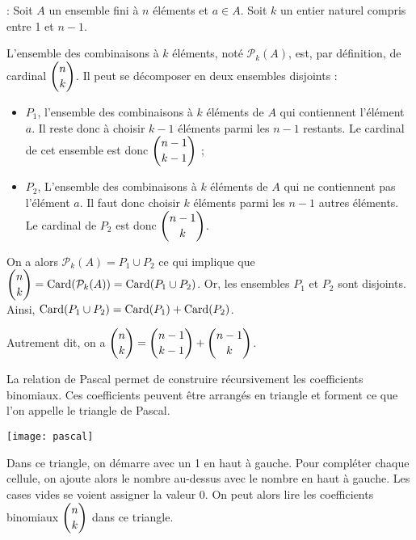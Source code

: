 \documentclass[11pt,fleqn, openany]{book} %
\begin{document}
\begin{demonstration}[Combinatoire] : Soit $A$ un ensemble fini à $n$ éléments et $a\in A$. Soit $k$ un entier naturel compris entre 1 et $n-1$. 

L'ensemble des combinaisons à $k$ éléments, noté $\mathcal{P}_k(A)$, est, par définition, de cardinal $\dbinom{n}{k}$. Il peut se décomposer en deux ensembles disjoints :
\begin{itemize}
\item $P_1$, l'ensemble des combinaisons à $k$ éléments de $A$ qui contiennent l'élément $a$. Il reste donc à choisir $k-1$ éléments parmi les $n-1$ restants. Le cardinal de cet ensemble est donc $\dbinom{n-1}{k-1}$ ;
\item $P_2$, L'ensemble des combinaisons à $k$ éléments de $A$ qui ne contiennent pas l'élément $a$. Il faut donc choisir $k$ éléments parmi les $n-1$ autres éléments. Le cardinal de $P_2$ est donc $\dbinom{n-1}{k}$.
\end{itemize}
On a alors $\mathcal{P}_k(A)=P_1 \cup P_2$ ce qui implique que $\dbinom{n}{k} = \mathrm{Card}(\mathcal{P}_k(A))=\mathrm{Card}(P_1 \cup P_2)$. Or, les ensembles $P_1$ et $P_2$ sont disjoints. Ainsi, $\mathrm{Card}(P_1 \cup P_2)= \mathrm{Card}(P_1)+\mathrm{Card}(P_2)$. 

Autrement dit, on a $\dbinom{n}{k}=\dbinom{n-1}{k-1}+\dbinom{n-1}{k}$.\end{demonstration}


\begin{proposition}La relation de Pascal permet de construire récursivement les coefficients binomiaux. Ces coefficients peuvent être arrangés en triangle et forment ce que l'on appelle le triangle de Pascal.
\vskip5pt
\begin{minipage}{0.45\linewidth}
\begin{center}
\texttt{[image: pascal]}
\end{center}
\end{minipage}\hfill\begin{minipage}{0.5\linewidth}
Dans ce triangle, on démarre avec un 1 en haut à gauche. Pour compléter chaque cellule, on ajoute alors le nombre au-dessus avec le nombre en haut à gauche. Les cases vides se voient assigner la valeur 0. On peut alors lire les coefficients binomiaux $\dbinom{n}{k}$ dans ce triangle.
\end{minipage}




\end{proposition}
\end{document}
